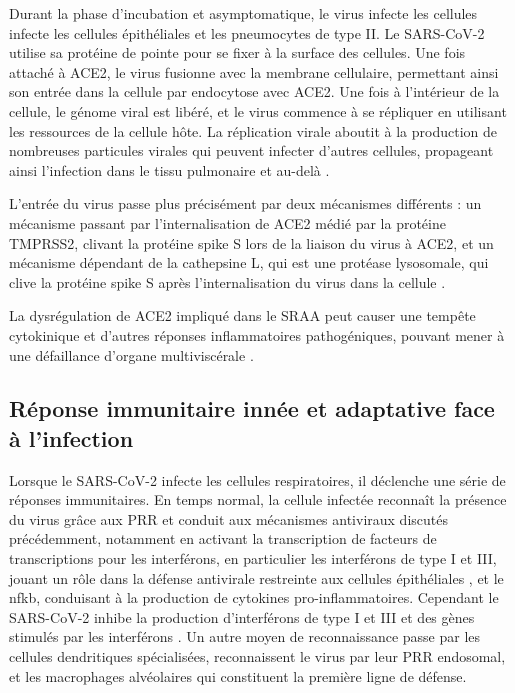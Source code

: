 \documentclass[
  a4paper,
  DIV=11,
  numbers=noendperiod,
  listof=totoc]{scrreprt}
\begin{document}
Durant la phase d'incubation et asymptomatique, le virus infecte les
cellules infecte les cellules épithéliales et les pneumocytes de type
II. Le \ac{SARS-CoV-2} utilise sa protéine de pointe pour se fixer à la
surface des cellules. Une fois attaché à \ac{ACE2}, le virus fusionne
avec la membrane cellulaire, permettant ainsi son entrée dans la cellule
par endocytose avec \ac{ACE2}. Une fois à l'intérieur de la cellule, le
génome viral est libéré, et le virus commence à se répliquer en
utilisant les ressources de la cellule hôte. La réplication virale
aboutit à la production de nombreuses particules virales qui peuvent
infecter d'autres cellules, propageant ainsi l'infection dans le tissu
pulmonaire et au-delà \autocite{Marik.2021,Asselah.2020}.

L'entrée du virus passe plus précisément par deux mécanismes différents
: un mécanisme passant par l'internalisation de ACE2 médié par la
protéine TMPRSS2, clivant la protéine spike S lors de la liaison du
virus à ACE2, et un mécanisme dépendant de la cathepsine L, qui est une
protéase lysosomale, qui clive la protéine spike S après
l'internalisation du virus dans la cellule \autocite{Hoffmann.2020}.

La dysrégulation de \ac{ACE2} impliqué dans le \ac{SRAA} peut causer une
tempête cytokinique et d'autres réponses inflammatoires pathogéniques,
pouvant mener à une défaillance d'organe multiviscérale
\autocite{Argano.2023}.

\subsection{Réponse immunitaire innée et adaptative face à
l'infection}\label{ruxe9ponse-immunitaire-innuxe9e-et-adaptative-face-uxe0-linfection}

Lorsque le SARS-CoV-2 infecte les cellules respiratoires, il déclenche
une série de réponses immunitaires. En temps normal, la cellule infectée
reconnaît la présence du virus grâce aux \ac{PRR} et conduit aux
mécanismes antiviraux discutés précédemment, notamment en activant la
transcription de facteurs de transcriptions pour les interférons, en
particulier les interférons de type I et III, jouant un rôle dans la
défense antivirale restreinte aux cellules épithéliales
\autocite{Maarifi.2020}, et le \ac{nfkb}, conduisant à la production de
cytokines pro-inflammatoires. Cependant le SARS-CoV-2 inhibe la
production d'interférons de type I et III et des gènes stimulés par les
interférons \autocite{Marik.2021}. Un autre moyen de reconnaissance
passe par les cellules dendritiques spécialisées, reconnaissent le virus
par leur \ac{PRR} endosomal, et les macrophages alvéolaires qui
constituent la première ligne de défense.
\end{document}
